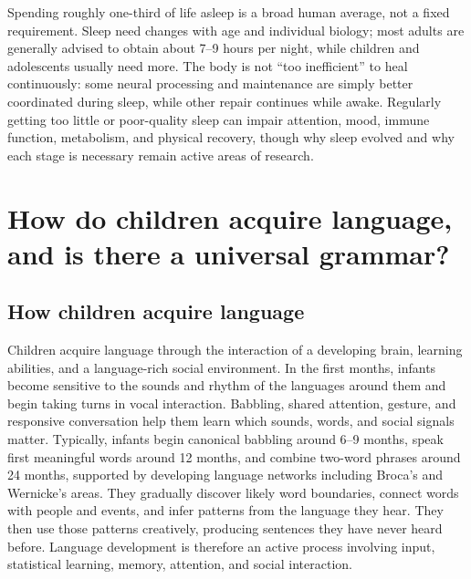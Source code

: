 \documentclass[11pt,oneside]{report}
\begin{document}
Spending roughly one-third of life asleep is a broad human average, not a fixed
requirement. Sleep need changes with age and individual biology; most adults
are generally advised to obtain about 7--9 hours per night, while children and
adolescents usually need more. The body is not ``too inefficient'' to heal
continuously: some neural processing and maintenance are simply better
coordinated during sleep, while other repair continues while awake. Regularly
getting too little or poor-quality sleep can impair attention, mood, immune
function, metabolism, and physical recovery, though why sleep evolved and why
each stage is necessary remain active areas of research.

\section{How do children acquire language, and is there a universal grammar?}

\subsection*{How children acquire language}

Children acquire language through the interaction of a developing brain,
learning abilities, and a language-rich social environment. In the first months,
infants become sensitive to the sounds and rhythm of the languages around them
and begin taking turns in vocal interaction. Babbling, shared attention,
gesture, and responsive conversation help them learn which sounds, words, and
social signals matter. Typically, infants begin canonical babbling around 6--9
months, speak first meaningful words around 12 months, and combine two-word
phrases around 24 months, supported by developing language networks including
Broca's and Wernicke's areas. They gradually discover likely word boundaries,
connect words with people and events, and infer patterns from the language they
hear. They then use those patterns creatively, producing sentences they have
never heard before. Language development is therefore an active process
involving input, statistical learning, memory, attention, and social
interaction.
\end{document}
